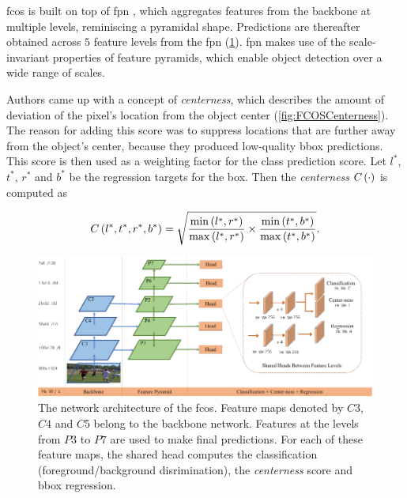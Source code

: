 \Gls{fcos} is built on top of \gls{fpn} \cite{Li2019}, which aggregates features from the backbone at multiple levels, reminiscing a pyramidal shape. Predictions are thereafter obtained across $5$ feature levels from the \gls{fpn} (\cref{fig:FCOSFeaturePyramid}). \gls{fpn} makes use of the scale-invariant properties of feature pyramids, which enable object detection over a wide range of scales.

Authors came up with a concept of \emph{centerness}, which describes the amount of deviation of the pixel's location from the object center (\cref{fig:FCOSCenterness}). The reason for adding this score was to suppress locations that are further away from the object's center, because they produced low-quality \gls{bbox} predictions. This score is then used as a weighting factor for the class prediction score. Let $l^*$, $t^*$, $r^*$ and $b^*$ be the regression targets for the box. Then the \emph{centerness} ${C} \left( \cdot \right)$ is computed as

\begin{equation}
    \label{eq:CenternessDetection}
    {C} \left( l^*, t^*, r^*, b^* \right) =
    \sqrt{
        \frac{
            {\min} \left( l^*, r^* \right)
        }{
            {\max} \left( l^*, r^* \right)
        }
        \times
        \frac{
            {\min} \left( t^*, b^* \right)
        }{
            {\max} \left( t^*, b^* \right)
        }
    }.
\end{equation}


\begin{figure}[t]
    \centerline{\includegraphics[width=\linewidth]{figures/theoretical_foundations/fcos_feature_pyramid.pdf}}
    \caption[\Gls{fcos} architecture]{The network architecture of the \gls{fcos}. Feature maps denoted by $C3$, $C4$ and $C5$ belong to the backbone network. Features at the levels from $P3$ to $P7$ are used to make final predictions. For each of these feature maps, the shared head computes the classification (foreground/background disrimination), the \emph{centerness} score and \gls{bbox} regression. }
    \label{fig:FCOSFeaturePyramid}
\end{figure}


